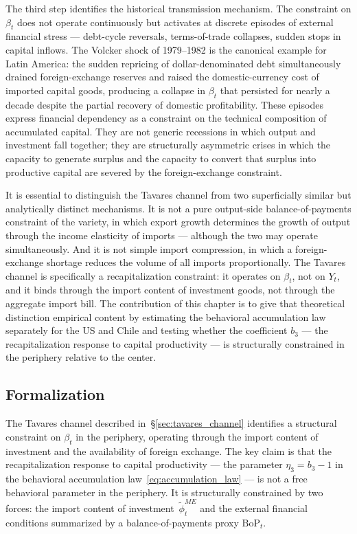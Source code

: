 \documentclass[12pt,letterpaper]{article}
\newcommand{\betat}{\beta_t}       %
\begin{document}
The third step identifies the historical transmission mechanism. The constraint
on $\betat$ does not operate continuously but activates at discrete episodes of
external financial stress --- debt-cycle reversals, terms-of-trade collapses,
sudden stops in capital inflows. The Volcker shock of 1979--1982 is the
canonical example for Latin America: the sudden repricing of dollar-denominated
debt simultaneously drained foreign-exchange reserves and raised the
domestic-currency cost of imported capital goods, producing a collapse in
$\betat$ that persisted for nearly a decade despite the partial recovery of
domestic profitability. These episodes express financial dependency as a
constraint on the technical composition of accumulated capital. They are not
generic recessions in which output and investment fall together; they are
structurally asymmetric crises in which the capacity to generate surplus and the
capacity to convert that surplus into productive capital are severed by the
foreign-exchange constraint.

It is essential to distinguish the Tavares channel from two superficially
similar but analytically distinct mechanisms. It is not a pure output-side
balance-of-payments constraint of the \citet{thirlwall1979} variety, in which
export growth determines the growth of output through the income elasticity of
imports --- although the two may operate simultaneously. And it is not simple
import compression, in which a foreign-exchange shortage reduces the volume of
all imports proportionally. The Tavares channel is specifically a
recapitalization constraint: it operates on $\betat$, not on $Y_t$, and it
binds through the import content of investment goods, not through the aggregate
import bill. The contribution of this chapter is to give that theoretical
distinction empirical content by estimating the behavioral accumulation law
separately for the US and Chile and testing whether the coefficient $b_3$ ---
the recapitalization response to capital productivity --- is structurally
constrained in the periphery relative to the center.


\subsection{Formalization}
\label{sec:tavares_formal}

The Tavares channel described in~\S\ref{sec:tavares_channel} identifies a
structural constraint on $\betat$ in the periphery, operating through the
import content of investment and the availability of foreign exchange. The key
claim is that the recapitalization response to capital productivity --- the
parameter $\eta_3 = b_3 - 1$ in the behavioral accumulation
law~\eqref{eq:accumulation_law} --- is not a free behavioral parameter in the
periphery. It is structurally constrained by two forces: the import content of
investment~$\tilde{\phi}^{ME}_t$ and the external financial conditions
summarized by a balance-of-payments proxy $\text{BoP}_t$.
\end{document}
